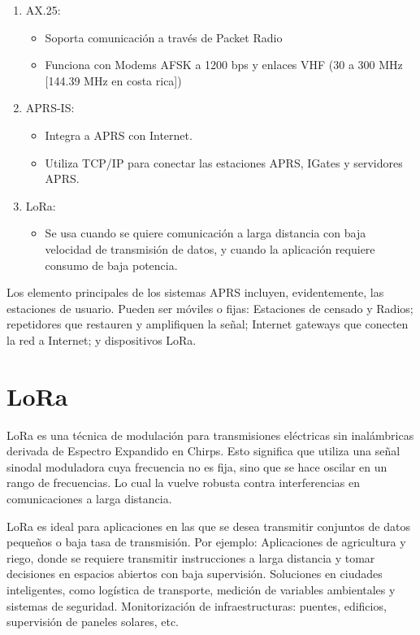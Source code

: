 \documentclass[conference]{IEEEtran}
\begin{document}
\begin{enumerate}
		\item AX.25: 
			\begin{itemize}
					\item Soporta comunicación a través de Packet Radio
					\item Funciona con Modems AFSK a 1200 bps y enlaces VHF (30 a 300 MHz [144.39 MHz  en costa rica])
			\end{itemize}
		\item APRS-IS:
			\begin{itemize}
					\item Integra a APRS con Internet.
					\item Utiliza TCP/IP para conectar las estaciones APRS, IGates y servidores APRS.
			\end{itemize}
		\item LoRa:
			\begin{itemize}
					\item Se usa cuando se quiere comunicación a larga distancia con baja velocidad de transmisión de datos,
					y cuando la aplicación requiere consumo de baja potencia.
			\end{itemize}
\end{enumerate}

Los elemento principales de los sistemas APRS incluyen, evidentemente, las estaciones de usuario.
Pueden ser móviles o fijas: Estaciones de censado y Radios; repetidores que restauren y amplifiquen la señal;
Internet gateways que conecten la red a Internet; y  dispositivos LoRa.

\section{LoRa}
LoRa es una técnica de modulación para transmisiones eléctricas sin inalámbricas derivada de Espectro Expandido en Chirps.
Esto significa que utiliza una señal sinodal moduladora cuya frecuencia no es fija,
sino que se hace oscilar en un rango de frecuencias. Lo cual la vuelve robusta contra interferencias 
en comunicaciones a larga distancia.

LoRa es ideal para aplicaciones en las que se desea transmitir conjuntos de datos pequeños o baja tasa de transmisión.
Por ejemplo: Aplicaciones de agricultura y riego, donde se requiere transmitir instrucciones a larga distancia y tomar decisiones
en espacios abiertos con baja supervisión. Soluciones en ciudades inteligentes, como logística de transporte,
medición de variables ambientales y sistemas de seguridad. Monitorización de infraestructuras: puentes, edificios,
supervisión de paneles solares, etc. 
\end{document}
